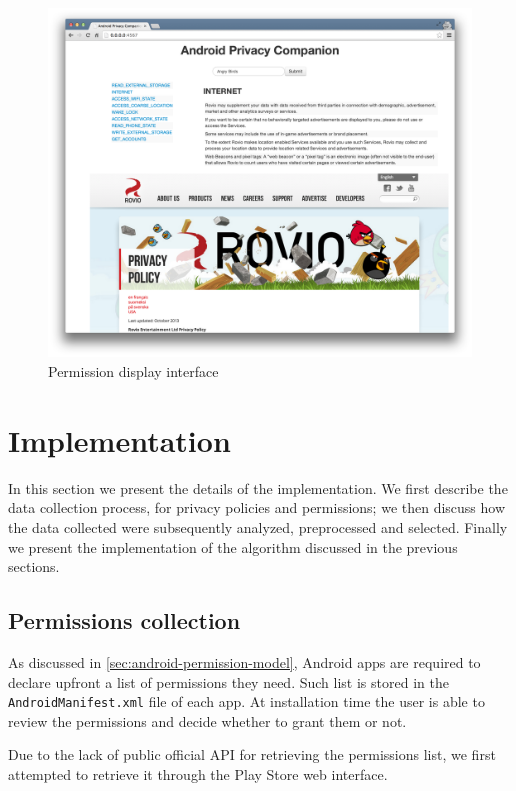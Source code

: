 \documentclass[twoside,letterpaper]{soups}
\theoremstyle{definition}
\begin{document}
\begin{figure}[ht]
\centering
     \includegraphics[width=\linewidth]{images/example-permission-selected}
      \caption{Permission display interface}
      \label{fig:example-permission-selected}
\end{figure}

\section{Implementation}
\label{sec:implem}
In this section we present the details of the implementation. We first describe the data collection process, for privacy policies and permissions; we then discuss how the data collected were subsequently analyzed, preprocessed and selected. Finally we present the implementation of the algorithm discussed in the previous sections.

\subsection{Permissions collection}
\label{sec:permissions-collection}
As discussed in \autoref{sec:android-permission-model}, Android apps are required to declare upfront a list of permissions they need. Such list is stored in the \texttt{AndroidManifest.xml} file of each app. At installation time the user is able to review the permissions and decide whether to grant them or not.

Due to the lack of public official API for retrieving the permissions list, we first attempted to retrieve it through the Play Store web interface.
\end{document}
